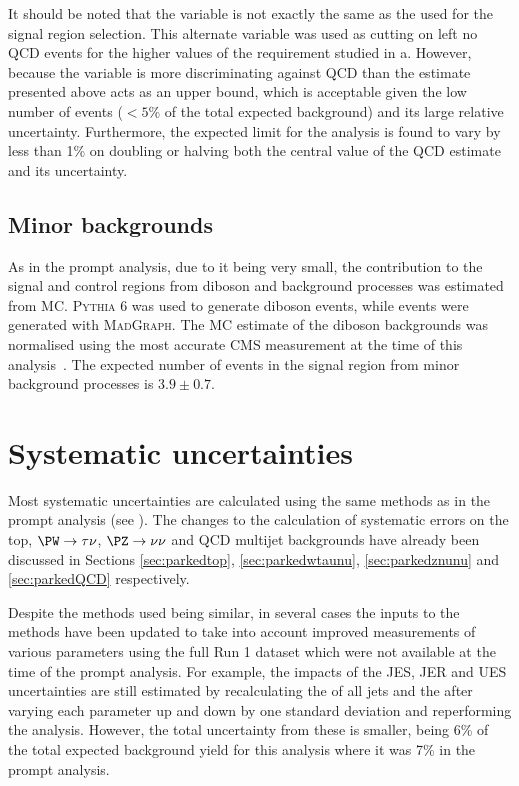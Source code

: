 It should be noted that the \jetmetdphileading variable is not exactly the same as the \jetmetdphi used for the signal region selection. This alternate variable was used as cutting on \jetmetdphi left no \ac{QCD} events for the higher values of the requirement studied in a. However, because the \jetmetdphi variable is more discriminating against \ac{QCD} than \jetmetdphileading the estimate presented above acts as an upper bound, which is acceptable given the low number of events ($<5\%$ of the total expected background) and its large relative uncertainty. Furthermore, the expected limit for the analysis is found to vary by less than 1\% on doubling or halving both the central value of the \ac{QCD} estimate and its uncertainty.


\subsection{Minor backgrounds}
\label{sec:parkedminor}
As in the prompt analysis, due to it being very small, the contribution to the signal and control regions from diboson and \Zmumu background processes was estimated from \ac{MC}. \textsc{Pythia 6} was used to generate diboson events, while \Zmumu events were generated with \textsc{MadGraph}. The \ac{MC} estimate of the diboson backgrounds was normalised using the most accurate CMS measurement at the time of this analysis~\cite{Chatrchyan2013190}. The expected number of events in the signal region from minor background processes is $3.9\pm 0.7$.

\section{Systematic uncertainties}
\label{sec:parkedsyst}
Most systematic uncertainties are calculated using the same methods as in the prompt analysis (see ). The changes to the calculation of systematic errors on the top, $\PW\rightarrow\tau\nu$, $\PZ\rightarrow\nu\nu$ and \ac{QCD} multijet backgrounds have already been discussed in Sections \ref{sec:parkedtop}, \ref{sec:parkedwtaunu}, \ref{sec:parkedznunu} and \ref{sec:parkedQCD} respectively.

Despite the methods used being similar, in several cases the inputs to the methods have been updated to take into account improved measurements of various parameters using the full Run 1 dataset which were not available at the time of the prompt analysis. For example, the impacts of the \ac{JES}, \ac{JER} and \ac{UES} uncertainties are still estimated by recalculating the \pt of all jets and the \MET after varying each parameter up and down by one standard deviation and reperforming the analysis. However, the total uncertainty from these is smaller, being 6\% of the total expected background yield for this analysis where it was 7\% in the prompt analysis.

